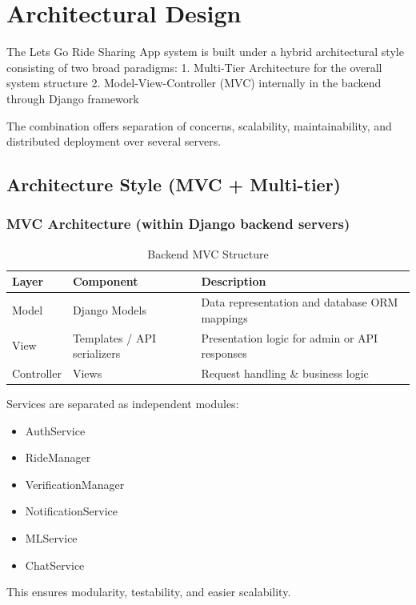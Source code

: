 \section{Architectural Design}

The Lets Go Ride Sharing App system is built under a hybrid architectural style consisting of two broad paradigms:
1. Multi-Tier Architecture for the overall system structure
2. Model-View-Controller (MVC) internally in the backend through Django framework

The combination offers separation of concerns, scalability, maintainability, and distributed deployment over several servers.

\subsection{Architecture Style (MVC + Multi-tier)}

\subsubsection{MVC Architecture (within Django backend servers)}

\begin{table}[htbp]
\centering
\caption{Backend MVC Structure}
\renewcommand{\arraystretch}{1.3}
\begin{tabularx}{\textwidth}{|X|X|X|}
\hline
\textbf{Layer} & \textbf{Component} & \textbf{Description} \\
\hline
Model & Django Models & Data representation and database ORM mappings \\
\hline
View & Templates / API serializers & Presentation logic for admin or API responses \\
\hline
Controller & Views & Request handling \& business logic \\
\hline
\end{tabularx}
\end{table}

Services are separated as independent modules:
\begin{itemize}
    \item AuthService
    \item RideManager
    \item VerificationManager
    \item NotificationService
    \item MLService
    \item ChatService
\end{itemize}
This ensures modularity, testability, and easier scalability.

